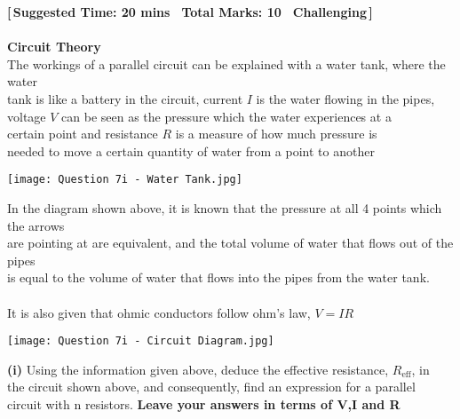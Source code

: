 \textbf{\hypertarget{P7}{[\,Suggested Time: 20 mins \textbar \, Total Marks: 10 \textbar \, Challenging\,]}}\\
\\
\textbf{Circuit Theory} \\
    The workings of a parallel circuit can be explained with a water tank, where the water \\
    tank is like a battery in the circuit, current \(I\) is the water flowing in the pipes, \\
    voltage \(V\) can be seen as the pressure which the water experiences at a \\
    certain point and resistance \(R\) is a measure of how much pressure is \\
    needed to move a certain quantity of water from a point to another
\begin{center}
    \texttt{[image: Question 7i - Water Tank.jpg]}
\end{center}
    In the diagram shown above, it is known that the pressure at all 4 points which the arrows \\
    are pointing at are equivalent, and the total volume of water that flows out of the pipes \\
    is equal to the volume of water that flows into the  pipes from the water tank. \\
    \\
    It is also given that ohmic conductors follow ohm's law, \(V = IR\) \\


\begin{center}
    \texttt{[image: Question 7i - Circuit Diagram.jpg]}
\end{center}

\newpage

    \textbf{(i)} Using the information given above, deduce the effective resistance, \(R_\text{eff}\), in \\
    \hspace*{13.5pt} the circuit shown above, and consequently, find an expression for a parallel \\
    \hspace*{13.5pt} circuit with n resistors. \textbf{Leave your answers in terms of V,I and R}  \\


